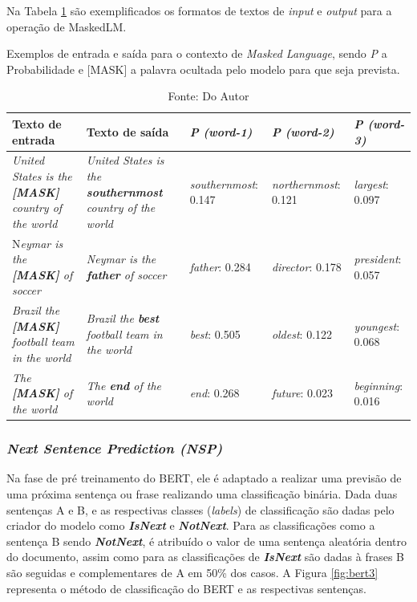 Na Tabela \ref{tab:tab1} são exemplificados os formatos de textos de \textit{input} e \textit{output} para a operação de MaskedLM.


\begin{table}[H]
    \centering
    \caption{Exemplos de entrada e saída para o contexto de\textit{ Masked Language}, sendo \textit{P} a Probabilidade e [MASK] a palavra ocultada pelo modelo para que seja prevista.}
    \begin{tabularx}{\textwidth}{XXXXX}
    \hline
        \textbf{Texto de entrada} & \textbf{Texto de saída} & \textbf{\textit{P (word-1)}} & \textbf{\textit{P (word-2)}} &\textbf{\textit{P (word-3)}} \\ \hline
     \textit{United States is the \textbf{[MASK]} country of the world}  & \textit{United States is the \textbf{southernmost} country of the world} & \textit{southernmost}: 0.147 & \textit{northernmost}: 0.121 & \textit{largest}: 0.097 \\ 
     N\textit{eymar is the \textbf{[MASK]} of soccer} &\textit{ Neymar is the \textbf{father} of soccer} & \textit{father}: 0.284 & \textit{director}: 0.178 & \textit{president}: 0.057 \\ 
    \textit{Brazil the\textbf{ [MASK]} football team in the world} & \textit{Brazil the \textbf{best} football team in the world}  & \textit{best}: 0.505 & \textit{oldest}: 0.122 & \textit{youngest}: 0.068 \\ 
    \textit{ The \textbf{[MASK]} of the world} &\textit{ The \textbf{end} of the world}  & \textit{end}: 0.268 & \textit{future}: 0.023 & \textit{beginning}: 0.016 \\ \hline
    \end{tabularx}
    \caption*{Fonte: Do Autor}
    \label{tab:tab1}
\end{table}


\subsubsection{\textit{Next Sentence Prediction (NSP)}}

Na fase de pré treinamento do BERT, ele é adaptado a realizar uma previsão de uma próxima sentença ou frase realizando uma classificação binária. Dada duas sentenças A e B, e as respectivas classes (\textit{labels}) de classificação são dadas pelo criador do modelo \cite{DBLP:journals/corr/abs-1810-04805} como \textbf{\textit{IsNext}} e \textbf{\textit{NotNext}}.
Para as classificações como a sentença B sendo \textbf{\textit{NotNext}}, é atribuído o valor de uma sentença aleatória dentro do documento, assim como para as classificações de \textbf{\textit{IsNext}} são dadas à frases B são seguidas e complementares de A em 50\% dos casos. A Figura \ref{fig:bert3} representa o método de classificação do BERT e as respectivas sentenças.

